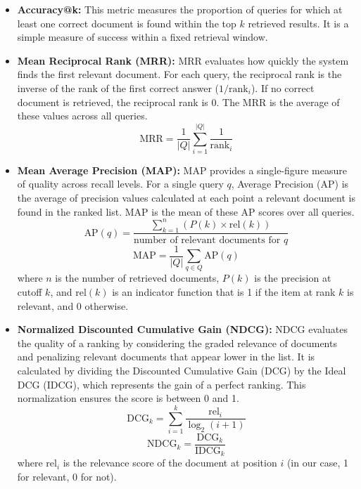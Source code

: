 \documentclass[manuscript,screen,review]{acmart}
\begin{document}
\begin{itemize}
    \item \textbf{Accuracy@k:} This metric measures the proportion of queries for which at least one correct document is found within the top $k$ retrieved results. It is a simple measure of success within a fixed retrieval window.
    
    \item \textbf{Mean Reciprocal Rank (MRR):} MRR evaluates how quickly the system finds the first relevant document. For each query, the reciprocal rank is the inverse of the rank of the first correct answer ($1/\text{rank}_i$). If no correct document is retrieved, the reciprocal rank is 0. The MRR is the average of these values across all queries.
    \begin{equation}
        \text{MRR} = \frac{1}{|Q|} \sum_{i=1}^{|Q|} \frac{1}{\text{rank}_i}
    \end{equation}
    
    \item \textbf{Mean Average Precision (MAP):} MAP provides a single-figure measure of quality across recall levels. For a single query $q$, Average Precision (AP) is the average of precision values calculated at each point a relevant document is found in the ranked list. MAP is the mean of these AP scores over all queries.
    \begin{equation}
        \text{AP}(q) = \frac{\sum_{k=1}^{n} (P(k) \times \text{rel}(k))}{\text{number of relevant documents for } q}
    \end{equation}
    \begin{equation}
        \text{MAP} = \frac{1}{|Q|} \sum_{q \in Q} \text{AP}(q)
    \end{equation}
    where $n$ is the number of retrieved documents, $P(k)$ is the precision at cutoff $k$, and $\text{rel}(k)$ is an indicator function that is 1 if the item at rank $k$ is relevant, and 0 otherwise.

    \item \textbf{Normalized Discounted Cumulative Gain (NDCG):} NDCG evaluates the quality of a ranking by considering the graded relevance of documents and penalizing relevant documents that appear lower in the list. It is calculated by dividing the Discounted Cumulative Gain (DCG) by the Ideal DCG (IDCG), which represents the gain of a perfect ranking. This normalization ensures the score is between 0 and 1.
    \begin{equation}
        \text{DCG}_k = \sum_{i=1}^{k} \frac{\text{rel}_i}{\log_2(i+1)}
    \end{equation}
    \begin{equation}
        \text{NDCG}_k = \frac{\text{DCG}_k}{\text{IDCG}_k}
    \end{equation}
    where $\text{rel}_i$ is the relevance score of the document at position $i$ (in our case, 1 for relevant, 0 for not).
\end{itemize}
\end{document}
